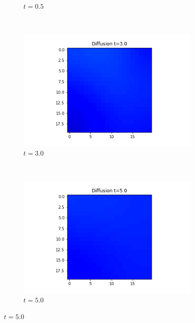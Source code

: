 \documentclass[10pt,a4paper]{article}
\begin{document}
\begin{enumerate}[i)]
\begin{enumerate}[a)]
\begin{figure}[H]
\begin{subfigure}[b]{0.25\textwidth}
         				\caption{$t=0.5$}
         				\label{gridt05x01}
         			\end{subfigure}~
         			\begin{subfigure}[b]{0.25\textwidth}
         				\includegraphics[width= \textwidth]{images/grid-t3-x01.png}
         				\caption{$t=3.0$}
         				\label{gridt3x01}
         			\end{subfigure}~
         			\begin{subfigure}[b]{0.25\textwidth}
         				\includegraphics[width= \textwidth]{images/grid-t5-x01.png}
         				\caption{$t=5.0$}
         				\label{gridt5x01}
         			\end{subfigure}
         		   \label{gridx01}
         		\end{figure}
         		

\end{enumerate}
\end{enumerate}
\end{document}
